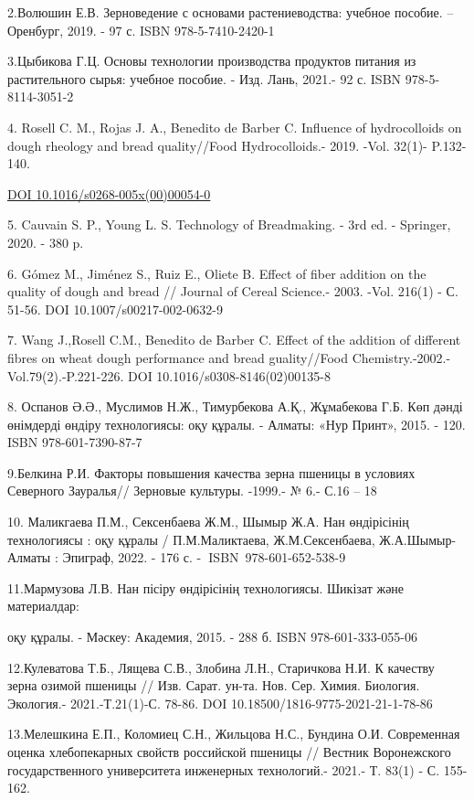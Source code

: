 {{2.Волюшин Е.В. Зерноведение с основами растениеводства: учебное пособие.
-- Оренбург, 2019. - 97 с. ISBN 978-5-7410-2420-1

3.Цыбикова Г.Ц. Основы технологии производства продуктов питания из
растительного сырья: учебное пособие. - Изд. Лань, 2021.- 92 с. ISBN
978-5-8114-3051-2

4. Rosell C. M., Rojas J. A., Benedito de Barber C. Influence of
hydrocolloids on dough rheology and bread quality//Food Hydrocolloids.-
2019. -Vol. 32(1)- P.132-140.

\href{https://doi.org/10.1016/s0268-005x(00)00054-0}{DOI
10.1016/s0268-005x(00)00054-0}

5. Cauvain S. P., Young L. S. Technology of Breadmaking. - 3rd ed. -
Springer, 2020. - 380 p.

6. Gómez M., Jiménez S., Ruiz E., Oliete B. Effect of fiber addition on
the quality of dough and bread // Journal of Cereal Science.- 2003.
-Vol. 216(1) - С. 51-56. DOI 10.1007/s00217-002-0632-9

7. Wang J.,Rosell C.M., Benedito de Barber C. Effect of the addition of
different fibres on wheat dough performance and bread guality//Food
Chemistry.-2002.-Vol.79(2).-P.221-226. DOI 10.1016/s0308-8146(02)00135-8

8. Оспанов Ә.Ә., Муслимов Н.Ж., Тимурбекова А.Қ., Жұмабекова Г.Б. Көп
дәнді өнімдерді өндіру технологиясы: оқу құралы. - Алматы: «Нур Принт»,
2015. - 120. ISBN 978-601-7390-87-7

9.Белкина Р.И. Факторы повышения качества зерна пшеницы в условиях
Северного Зауралья// Зерновые культуры. -1999.- № 6.- С.16 -- 18

10. Маликгаева П.М., Сексенбаева Ж.М., Шымыр Ж.А. Нан өндірісінің
технологиясы : оқу құралы / П.М.Маликтаева, Ж.М.Сексенбаева, Ж.А.Шымыр-
Алматы : Эпиграф, 2022. - 176 с. -{\bfseries ~}ISBN~978-601-652-538-9

11.Мармузова Л.В. Нан пісіру өндірісінің технологиясы. Шикізат және
материалдар:

оқу құралы. - Мәскеу: Академия, 2015. - 288 б. ISBN 978-601-333-055-06

12.Кулеватова Т.Б., Лящева С.В., Злобина Л.Н., Старичкова Н.И. К
качеству зерна озимой пшеницы // Изв. Сарат. ун-та. Нов. Сер. Химия.
Биология. Экология.- 2021.-Т.21(1)-С. 78-86. DOI
10.18500/1816-9775-2021-21-1-78-86

13.Мелешкина Е.П., Коломиец С.Н., Жильцова Н.С., Бундина О.И.
Современная оценка хлебопекарных свойств российской пшеницы // Вестник
Воронежского государственного университета инженерных технологий.-
2021.- Т. 83(1) - С. 155-162.

}}
